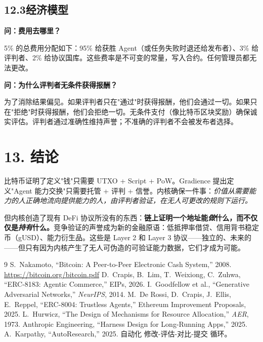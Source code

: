 \documentclass[11pt,a4paper]{article}
\begin{document}
\subsection{12.3\quad 经济模型}

\textbf{问：费用去哪里？}

5\% 的总费用分配如下：95\% 给获胜 Agent（或任务失败时退还给发布者）、3\% 给评判者、2\% 给协议国库。这些费率是不可变的常量，写入合约。任何管理员都无法更改。

\textbf{问：为什么评判者无条件获得报酬？}

为了消除结果偏见。如果评判者只在"通过"时获得报酬，他们会通过一切。如果只在"拒绝"时获得报酬，他们会拒绝一切。无条件支付（像比特币区块奖励）确保诚实评估。评判者通过准确性维持声誉；不准确的评判者不会被发布者选择。

\section{13. 结论}

比特币证明了定义"钱"只需要 UTXO + Script + PoW。Gradience 提出定义"Agent 能力交换"只需要托管 + 评判 + 信誉。内核确保一件事：\emph{价值从需要能力的人正确地流向提供能力的人，由评判者验证，在无人可更改的规则下运行。}

但内核创造了现有 DeFi 协议所没有的东西：\textbf{链上证明一个地址能\emph{做}什么，而不仅仅是\emph{持有}什么。}竞争验证的声誉成为新的金融原语：低抵押率借贷、信用背书稳定币（gUSD）、能力衍生品。这些是 Layer 2 和 Layer 3 协议——独立的、未来的——但只有因为内核产生了无人可伪造的可验证能力数据，它们才成为可能。

\begin{thebibliography}{9}
 S.~Nakamoto, ``Bitcoin: A Peer-to-Peer Electronic Cash System,'' 2008. \url{https://bitcoin.org/bitcoin.pdf}
 D.~Crapis, B.~Lim, T.~Weixiong, C.~Zuhwa, ``ERC-8183: Agentic Commerce,'' EIPs, 2026.
 I.~Goodfellow et al., ``Generative Adversarial Networks,'' \emph{NeurIPS}, 2014.
 M.~De Rossi, D.~Crapis, J.~Ellis, E.~Reppel, ``ERC-8004: Trustless Agents,'' Ethereum Improvement Proposals, 2025.
 L.~Hurwicz, ``The Design of Mechanisms for Resource Allocation,'' \emph{AER}, 1973.
 Anthropic Engineering, ``Harness Design for Long-Running Apps,'' 2025.
 A.~Karpathy, ``AutoResearch,'' 2025. 自动化 修改-评估-对比-提交 循环。
\end{thebibliography}
\end{document}
